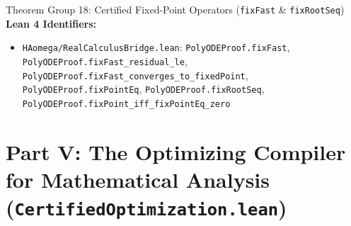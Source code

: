 \documentclass[11pt,a4paper]{article}
\newcommand{\lean}[1]{\texttt{\nolinkurl{#1}}}
\begin{document}
\begin{thmcard}{Theorem Group 18: Certified Fixed-Point Operators (\lean{fixFast} \& \lean{fixRootSeq})}
\textbf{Lean 4 Identifiers:}
\begin{itemize}
  \item \lean{HAomega/RealCalculusBridge.lean}: \lean{PolyODEProof.fixFast}, \lean{PolyODEProof.fixFast_residual_le}, \lean{PolyODEProof.fixFast_converges_to_fixedPoint}, \lean{PolyODEProof.fixPointEq}, \lean{PolyODEProof.fixRootSeq}, \lean{PolyODEProof.fixPoint_iff_fixPointEq_zero}
\end{itemize}
\end{thmcard}

\newpage
\section{Part V: The Optimizing Compiler for Mathematical Analysis (\texorpdfstring{\lean{CertifiedOptimization.lean}}{CertifiedOptimization.lean})}
\end{document}
